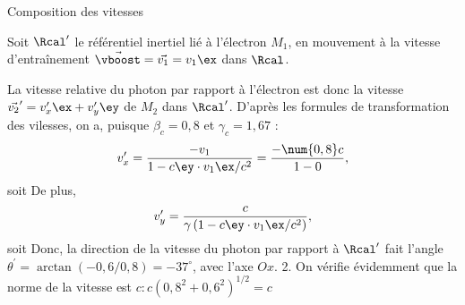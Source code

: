 \begin{exo}[PC][1][appli]{Composition des vitesses}
\begin{corrige}
    Soit $\Rcal'$ le référentiel inertiel lié à l'électron $M_1$, en mouvement à la vitesse d'entraînement $\Vec{\vboost} = \Vec{v_1} = v_1 \ex$ dans $\Rcal$. 
    
    La vitesse relative du photon par rapport à l'électron est donc la vitesse $\Vec{v_2}' = v_x' \ex + v_y' \ey$ de $M_2$ dans $\Rcal'$. D'après les formules de transformation des vilesses, on a, puisque $\beta_c=0,8$ et $\gamma_c=1,67$ :
$$
v_x^{\prime}=\frac{-v_1}{1-c \ey \cdot v_1 \ex / c^2} = \frac{-\num{0,8} c}{1-0},
$$
soit 
De plus,
$$
 v_y^{\prime}=\frac{c}{\gamma \left(1-c \ey \cdot v_1 \ex  / c^2\right)},
$$
soit 
Donc, la direction de la vitesse du photon par rapport à $\Rcal^{\prime}$ fait l'angle $\theta^{\prime}=\arctan (-0,6 / 0,8)=-37^{\circ}$, avec l'axe $O x$.
2. On vérifie évidemment que la norme de la vitesse est $c: c\left(0,8^2+0,6^2\right)^{1 / 2}=c$
  \end{corrige}
  
  
\end{exo}


